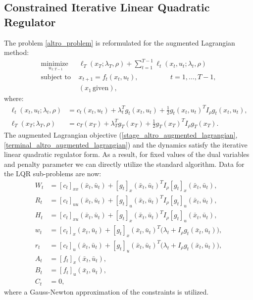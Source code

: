 \subsection{Constrained Iterative Linear Quadratic Regulator}
The problem \eqref{altro_problem} is reformulated for the augmented Lagrangian method:
\begin{equation}
	\begin{array}{ll}
		\underset{u_{1:T-1}}{\mbox{minimize }} & \ell_T(x_T; \lambda_T, \rho) + \sum \limits_{t = 1}^{T-1} \ell_t(x_t, u_t; \lambda_t, \rho)\\
		\mbox{subject to } & x_{t+1} = f_t(x_t, u_t),\phantom{\mathcal{K},} \quad \quad \quad \, t = 1,\dots,T-1,\\
		& (x_1 \, \text{given}), \label{altro_augmented_lagrangian_problem}
	\end{array}
\end{equation}
where:
\begin{align}
	\ell_t(x_t, u_t; \lambda_t, \rho) &= c_t(x_t, u_t) + \lambda_t^T g_t(x_t, u_t) + \frac{1}{2} g_t(x_t, u_t)^T I_{\rho} g_t(x_t, u_t), \label{stage_altro_augmented_lagrangian}\\
	\ell_T(x_T; \lambda_T, \rho) &= c_T(x_T) + \lambda_T^T g_T(x_T) + \frac{1}{2} g_T(x_T)^T I_{\rho} g_T(x_T). \label{terminal_altro_augmented_lagrangian}
\end{align}
The augmented Lagrangian objective (\ref{stage_altro_augmented_lagrangian}, \ref{terminal_altro_augmented_lagrangian}) and the dynamics satisfy the iterative linear quadratic regulator form. As a result, for fixed values of the dual variables and penalty parameter we can directly utilize the standard algorithm. Data for the LQR sub-problems are now:
\begin{align}
	W_t &= [c_t]_{xx}(\bar{x}_t, \bar{u}_t) + [g_t]_{x}(\bar{x}_t, \bar{u}_t)^T I_{\rho} [g_t]_{x}(\bar{x}_t, \bar{u}_t), \\
	R_t &= [c_t]_{uu}(\bar{x}_t, \bar{u}_t) + [g_t]_{u}(\bar{x}_t, \bar{u}_t)^T I_{\rho} [g_t]_{u}(\bar{x}_t, \bar{u}_t), \\
	H_t &= [c_t]_{xu}(\bar{x}_t, \bar{u}_t) + [g_t]_{x}(\bar{x}_t, \bar{u}_t)^T I_{\rho} [g_t]_{u}(\bar{x}_t, \bar{u}_t), \\
	w_t &= [c_t]_{x}(\bar{x}_t, \bar{u}_t) + [g_t]_{x}(\bar{x}_t, \bar{u}_t)^T \Big(\lambda_t + I_{\rho} g_t(\bar{x}_t, \bar{u}_t) \Big), \\
	r_t &= [c_t]_{u}(\bar{x}_t, \bar{u}_t) + [g_t]_{u}(\bar{x}_t, \bar{u}_t)^T \Big(\lambda_t + I_{\rho} g_t(\bar{x}_t, \bar{u}_t) \Big), \\
	A_t &= [f_t]_{x}(\bar{x}_t, \bar{u}_t), \\
	B_t &= [f_t]_{u}(\bar{x}_t, \bar{u}_t), \\
	C_t &= 0,
\end{align}
where a Gauss-Newton approximation of the constraints is utilized.

